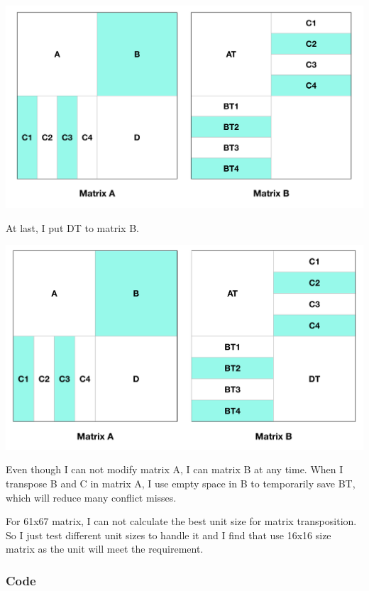 \documentclass{article}
\begin{document}
\includegraphics[scale=0.35]{6.png}

At last, I put DT to matrix B.

\includegraphics[scale=0.35]{7.png}

Even though I can not modify matrix A, I can matrix B at any time. When I transpose B and C in matrix A, I use empty space in B to temporarily save BT, which will reduce many conflict misses.

For 61x67 matrix, I can not calculate the best unit size for matrix transposition. So I just test different unit sizes to handle it and I find that use 16x16 size matrix as the unit will meet the requirement.
\subsubsection{Code}
\end{document}
